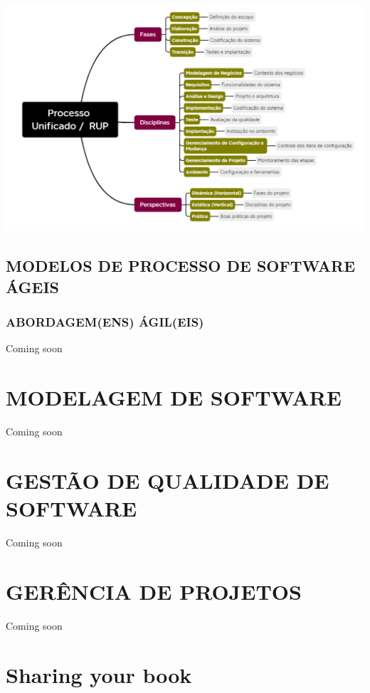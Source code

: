 \documentclass[
]{book}
\begin{document}
\includegraphics{images/modelos_processos_software/rup.png}

\section{MODELOS DE PROCESSO DE SOFTWARE ÁGEIS}\label{modelos-de-processo-de-software-uxe1geis}

\subsection{ABORDAGEM(ENS) ÁGIL(EIS)}\label{abordagemens-uxe1gileis}

Coming soon

\chapter{MODELAGEM DE SOFTWARE}\label{modelagem-de-software}

Coming soon

\chapter{GESTÃO DE QUALIDADE DE SOFTWARE}\label{gestuxe3o-de-qualidade-de-software}

Coming soon

\chapter{GERÊNCIA DE PROJETOS}\label{geruxeancia-de-projetos}

Coming soon

\chapter{Sharing your book}\label{sharing-your-book}
\end{document}
